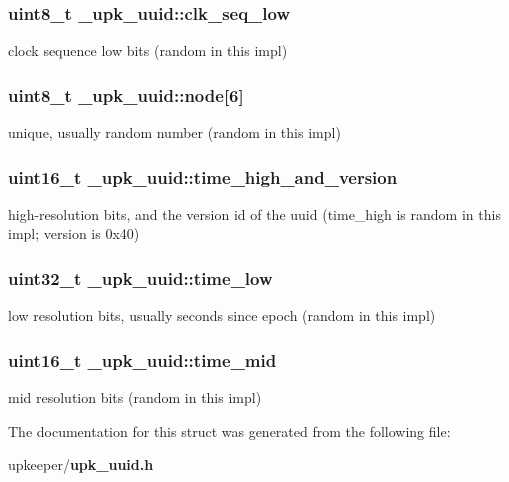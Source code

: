 \subsubsection{\setlength{\rightskip}{0pt plus 5cm}uint8\_\-t \bf{\_\-upk\_\-uuid::clk\_\-seq\_\-low}}\label{struct__upk__uuid_712e49442d303d785d7293a28ad5abe4}


clock sequence low bits (random in this impl) 
\subsubsection{\setlength{\rightskip}{0pt plus 5cm}uint8\_\-t \bf{\_\-upk\_\-uuid::node}[6]}\label{struct__upk__uuid_1a897bf0dec44233ab1f78bd067a504f}


unique, usually random number (random in this impl) 
\subsubsection{\setlength{\rightskip}{0pt plus 5cm}uint16\_\-t \bf{\_\-upk\_\-uuid::time\_\-high\_\-and\_\-version}}\label{struct__upk__uuid_b036a4c1fa0c67dcf22b99ce467c0f68}


high-resolution bits, and the version id of the uuid (time\_\-high is random in this impl; version is 0x40) 
\subsubsection{\setlength{\rightskip}{0pt plus 5cm}uint32\_\-t \bf{\_\-upk\_\-uuid::time\_\-low}}\label{struct__upk__uuid_2dfc213588d275731787809c62ecce75}


low resolution bits, usually seconds since epoch (random in this impl) 
\subsubsection{\setlength{\rightskip}{0pt plus 5cm}uint16\_\-t \bf{\_\-upk\_\-uuid::time\_\-mid}}\label{struct__upk__uuid_14fca9dce423cda8af02c7715a096ffa}


mid resolution bits (random in this impl) 

The documentation for this struct was generated from the following file:\begin{CompactItemize}
\item 
upkeeper/\bf{upk\_\-uuid.h}\end{CompactItemize}
